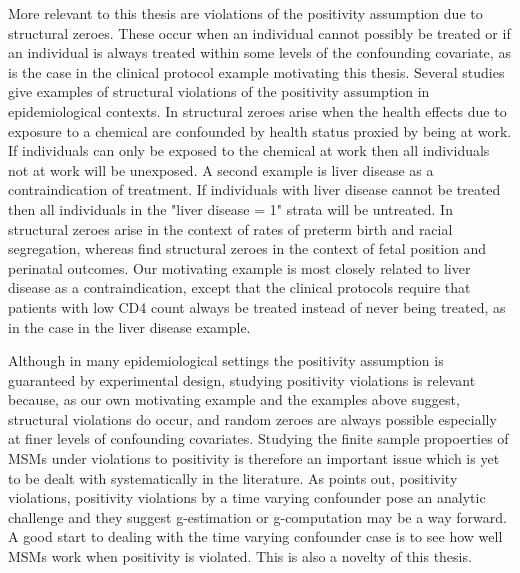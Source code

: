 \documentclass[11pt]{article}
\begin{document}
More relevant to this thesis are violations of the positivity assumption
due to structural zeroes. These occur when an individual cannot possibly
be treated or if an individual is always treated within some levels of
the confounding covariate, as is the case in the clinical protocol
example motivating this thesis. Several studies give examples of
structural violations of the positivity assumption in epidemiological
contexts. In \citet{Cole2008} structural zeroes arise when the health
effects due to exposure to a chemical are confounded by health status
proxied by being at work. If individuals can only be exposed to the
chemical at work then all individuals not at work will be unexposed. A
second example is liver disease as a contraindication of treatment. If
individuals with liver disease cannot be treated then all individuals in
the "liver disease = 1" strata will be untreated. In \citet{Messer2010}
structural zeroes arise in the context of rates of preterm birth and
racial segregation, whereas \citet{Cheng2010} find structural zeroes in
the context of fetal position and perinatal outcomes. Our motivating
example is most closely related to liver disease as a contraindication,
except that the clinical protocols require that patients with low CD4
count always be treated instead of never being treated, as in the case
in the liver disease example. \linebreak

Although in many epidemiological settings the positivity assumption is
guaranteed by experimental design, studying positivity violations is
relevant because, as our own motivating example and the examples above
suggest, structural violations do occur, and random zeroes are always
possible especially at finer levels of confounding covariates. Studying
the finite sample propoerties of MSMs under violations to positivity is
therefore an important issue which is yet to be dealt with
systematically in the literature. As \citet{Westreich2010} points out,
positivity violations, positivity violations by a time varying
confounder pose an analytic challenge and they suggest g-estimation or
g-computation may be a way forward. A good start to dealing with the
time varying confounder case is to see how well MSMs work when
positivity is violated. This is also a novelty of this thesis.
\end{document}
